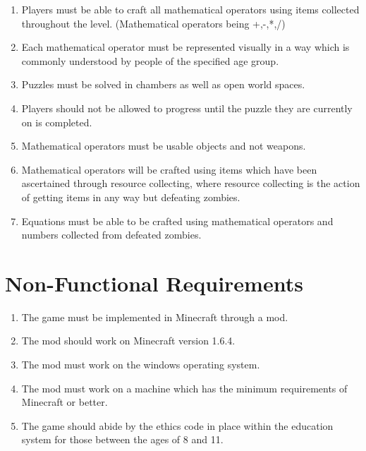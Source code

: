 \begin{enumerate}
	\item Players must be able to craft all mathematical operators using items collected throughout the level. (Mathematical operators being +,-,*,/) 
	
	\item Each mathematical operator must be represented visually in a way which is commonly understood by people of the specified age group.
	
	\item Puzzles must be solved in chambers as well as open world spaces.
	
	\item Players should not be allowed to progress until the puzzle they are currently on is completed.
	
	\item Mathematical operators must be usable objects and not weapons.
	
	\item Mathematical operators will be crafted using items which have been ascertained through resource collecting, where resource collecting is the action of getting items in any way but defeating zombies.
	
	\item Equations must be able to be crafted using mathematical operators and numbers collected from defeated zombies.
		
\end{enumerate}

\section{Non-Functional Requirements}
\begin{enumerate}
	\item The game must be implemented in Minecraft through a mod.
	\item The mod should work on Minecraft version 1.6.4.
	\item The mod must work on the windows operating system.
	\item The mod must work on a machine which has the minimum requirements of Minecraft or better.
	\item The game should abide by the ethics code in place within the education system for those between the ages of 8 and 11.
\end{enumerate}

